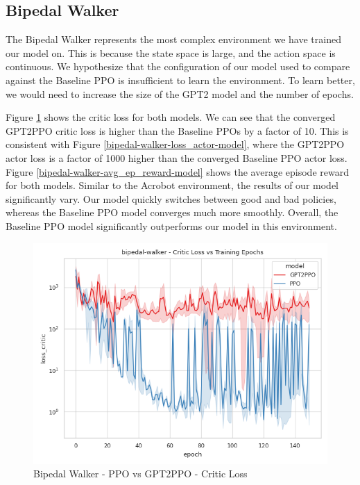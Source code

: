 \documentclass[conference]{IEEEtran}
\begin{document}
\subsection{Bipedal Walker}
The Bipedal Walker represents the most complex environment we have trained our model on. This is because the state space is large, and the action space is continuous. We hypothesize that the configuration of our model used to compare against the Baseline PPO is insufficient to learn the environment. To learn better, we would need to increase the size of the GPT2 model and the number of epochs.

Figure \ref{bipedal-walker-loss_critic-model} shows the critic loss for both models. We can see that the converged GPT2PPO critic loss is higher than the Baseline PPOs by a factor of 10. This is consistent with Figure \ref{bipedal-walker-loss_actor-model}, where the GPT2PPO actor loss is a factor of 1000 higher than the converged Baseline PPO actor loss. Figure \ref{bipedal-walker-avg_ep_reward-model} shows the average episode reward for both models. Similar to the Acrobot environment, the results of our model significantly vary. Our model quickly switches between good and bad policies, whereas the Baseline PPO model converges much more smoothly.
Overall, the Baseline PPO model significantly outperforms our model in this environment.

\begin{figure}[htbp]
    \centerline{\includegraphics[width=\columnwidth]{./img/bipedal-walker-loss_critic-model.png}}
    \caption{Bipedal Walker - PPO vs GPT2PPO - Critic Loss}
    \label{bipedal-walker-loss_critic-model}
\end{figure}
\end{document}
